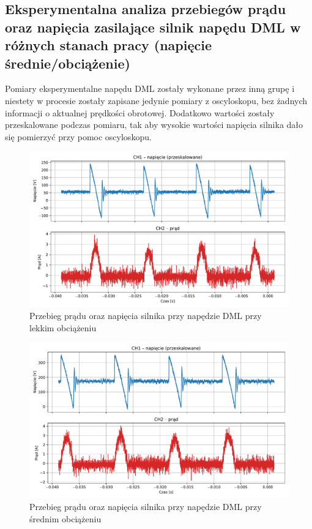 \documentclass[11pt]{article}
\begin{document}
\subsection{Eksperymentalna analiza przebiegów prądu oraz napięcia zasilające silnik napędu DML w różnych stanach pracy (napięcie średnie/obciążenie)}
Pomiary eksperymentalne napędu DML zostały wykonane przez inną grupę i niestety w procesie zostały zapisane jedynie pomiary z oscyloskopu, bez żadnych informacji o aktualnej prędkości obrotowej. Dodatkowo wartości zostały przeskalowane podczas pomiaru, tak aby wysokie wartości napięcia silnika dało się pomierzyć przy pomoc oscyloskopu. 
\begin{figure}[H]
    \centering
    \includegraphics[width=1\linewidth]{aun1_dml2_obciazenie_weak.pdf}
    \caption{Przebieg prądu oraz napięcia silnika przy napędzie DML przy lekkim obciążeniu}
    \label{fig:dml_obciazenie_weak}
\end{figure}
\begin{figure}[H]
    \centering
    \includegraphics[width=1\linewidth]{aun1_dml2_obciazenie_medium.pdf}
    \caption{Przebieg prądu oraz napięcia silnika przy napędzie DML przy średnim obciążeniu}
    \label{fig:dml_obciazenie_medium}
\end{figure}
\end{document}
